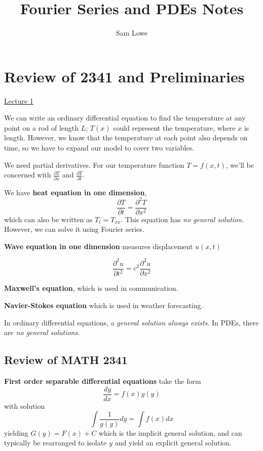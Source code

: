 \documentclass[12pt]{article}
\title{Fourier Series and PDEs Notes}
\author{Sam Lowe}
\begin{document}
\maketitle

\tableofcontents

\pagebreak



\section{Review of 2341 and Preliminaries}

\underline{Lecture 1}

We can write an ordinary differential equation to find the temperature at any point on a rod of length $L$; $T(x)$ could represent the temperature, where $x$ is length. However, we know that the temperature at each point also depends on time, so we have to expand our model to cover two variables.

We need partial derivatives. For our temperature function $T = f(x, t)$, we'll be concerned with $\frac{\partial T}{\partial x}$ and $\frac{\partial T}{\partial t}$.

We have \textbf{heat equation in one dimension}, $$\frac{\partial T}{\partial t} = \frac{\partial^2 T}{\partial x^2}$$ which can also be written as $T_t = T_{xx}$. This equation has \textit{no general solution.} However, we can solve it using Fourier series.

\textbf{Wave equation in one dimension} measures displacement $u(x, t)$

$$\frac{\partial^2 u}{\partial t^2} = c^2\frac{\partial^2 u}{\partial x^2}$$

\textbf{Maxwell's equation}, which is used in communication.

\textbf{Navier-Stokes equation} which is used in weather forecasting.

In ordinary differential equations, a \textit{general solution always exists}. In PDEs, there are \textit{no general solutions}.

\subsection{Review of MATH 2341}

\textbf{First order separable differential equations} take the form $$\frac{dy}{dx} = f(x)g(y)$$ with solution $$\int \frac{1}{g(y)}dy = \int f(x)dx$$ yielding $G(y) = F(x) + C$ which is the implicit general solution, and can typically be rearranged to isolate $y$ and yield an explicit general solution.
\end{document}
